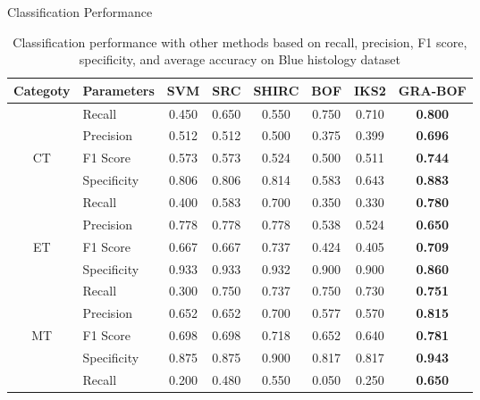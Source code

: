 \documentclass [9pt,times] {beamer}
\begin{document}
\begin{frame}{Classification Performance}

\begin{table}
\centering
\caption{Classification performance  with  other methods based on  recall, precision, F1 score, specificity, and average accuracy on Blue histology dataset}
    \label{tab:cm}
{\scriptsize
\renewcommand{\arraystretch}{1.2} 
\begin{tabular}{|c|l|c|c|c|c|c|c|}
\hline
Categoty    &    Parameters    &    SVM    &    SRC    &    SHIRC    &    BOF    &    IKS2    &    GRA-BOF    \\
\hline
    &    Recall    &    0.450    &    0.650    &    0.550    &    0.750    &    0.710    &    \textbf{0.800    }\\
    &    Precision    &    0.512    &    0.512    &    0.500    &    0.375    &    0.399    &    \textbf{0.696}    \\
CT    &    F1 Score     &    0.573    &    0.573    &    0.524    &    0.500    &    0.511    &    \textbf{0.744    }\\
    &    Specificity    &    0.806    &    0.806    &    0.814    &    0.583    &    0.643    &    \textbf{0.883    }\\
    \hline
    &    Recall    &    0.400    &    0.583    &    0.700    &    0.350    &    0.330    &    \textbf{0.780    }\\
    &    Precision    &    0.778    &    0.778    &    0.778    &    0.538    &    0.524    &    \textbf{0.650    }\\
ET    &    F1 Score     &    0.667    &    0.667    &    0.737    &    0.424    &    0.405    &\textbf{    0.709    }\\
    &    Specificity    &    0.933    &    0.933    &    0.932    &    0.900    &    0.900    &    \textbf{0.860}    \\
    \hline
    &    Recall    &    0.300    &    0.750    &    0.737    &    0.750    &    0.730    &\textbf{    0.751    }\\
    &    Precision    &    0.652    &    0.652    &    0.700    &    0.577    &    0.570    &    \textbf{0.815}    \\
MT    &    F1 Score     &    0.698    &    0.698    &    0.718    &    0.652    &    0.640    &    \textbf{0.781    }\\
    &    Specificity    &    0.875    &    0.875    &    0.900    &    0.817    &    0.817    &\textbf{    0.943}    \\
    \hline
    &    Recall    &    0.200    &    0.480    &    0.550    &    0.050    &    0.250    &    \textbf{0.650    }\\

\end{tabular}}
\end{table}
\end{frame}
\end{document}

